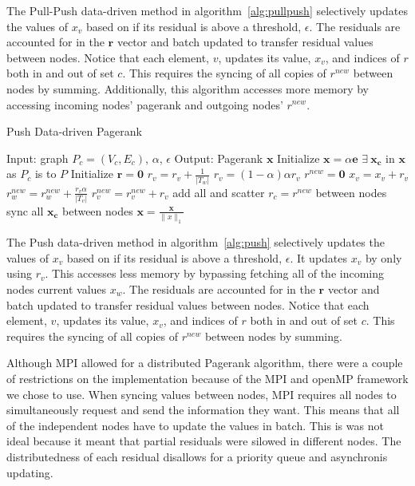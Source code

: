 \documentclass[letterpaper,12pt,onecolumn]{article}
\begin{document}
The Pull-Push data-driven method in algorithm~\ref{alg:pullpush} selectively updates the values of $x_v$ based on if its residual is above a threshold, $\epsilon$. The residuals are accounted for in the $\mathbf{r}$ vector and batch updated to transfer residual values between nodes. Notice that each element, $v$, updates its value, $x_v$, and indices of $r$ both in and out of set $c$. This requires the syncing of all copies of $r^{new}$ between nodes by summing. Additionally, this algorithm accesses more memory by accessing incoming nodes' pagerank and outgoing nodes' $r^{new}$.

\begin{algorithm}
\caption{Push Data-driven Pagerank}
\label{alg:push}
\begin{algorithmic}[1]
  \STATE Input: graph $P_{c} = (V_c, E_c)$, $\alpha$, $\epsilon$
  \STATE Output: Pagerank $\mathbf{x}$
  \STATE Initialize $\mathbf{x} = \alpha \mathbf{e}$
  \STATE $\exists  \medspace \mathbf{x_c}$ in $\mathbf{x}$ as $P_c$ is to $P$
  \STATE Initialize $\mathbf{r} = \mathbf{0}$
		\STATE $r_v = r_v + \frac{1}{|T_w|}$
	\ENDFOR
	\STATE $r_v = (1 - \alpha)\alpha r_v$
  \ENDFOR
	\STATE $r^{new} = \mathbf{0}$
			\STATE $x_{v} = x_{v} + r_v $
				\STATE $r_w^{new} = r_w^{new} + \frac{r_v \alpha}{|T_v|}$
			\ENDFOR
		\ELSE
			\STATE $r_v^{new} = r_v^{new} + r_v$
		\ENDIF
	\ENDFOR
	\STATE add all and scatter $ r_c = r^{new}$ between nodes
  \ENDWHILE
\STATE sync all $\mathbf{x_c}$ between nodes
  \STATE $\mathbf{x} = \frac{\mathbf{x} }{\|x\|_{1}}$
\end{algorithmic}
\end{algorithm}

The Push data-driven method in algorithm~\ref{alg:push} selectively updates the values of $x_v$ based on if its residual is above a threshold, $\epsilon$. It updates $x_v$ by only using $r_v$. This accesses less memory by bypassing fetching all of the incoming nodes current values $x_w$. The residuals are accounted for in the $\mathbf{r}$ vector and batch updated to transfer residual values between nodes. Notice that each element, $v$, updates its value, $x_v$, and indices of $r$ both in and out of set $c$. This requires the syncing of all copies of $r^{new}$ between nodes by summing. 

Although MPI allowed for a distributed Pagerank algorithm, there were a couple of restrictions on the implementation because of the MPI and openMP framework we chose to use. When syncing values between nodes, MPI requires all nodes to simultaneously request and send the information they want. This means that all of the independent nodes have to update the values in batch. This is was not ideal because it meant that partial residuals were silowed in different nodes. The distributedness of each residual disallows for a priority queue and asynchronis updating. 
\end{document}
